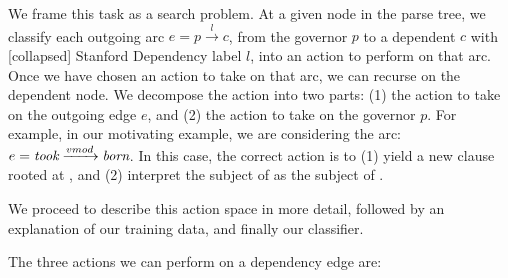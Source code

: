 
We frame this task as a search problem.
At a given node in the parse tree, we classify each outgoing arc
  $e = p \xrightarrow{l} c$, from the governor $p$ to a dependent $c$ 
  with [collapsed] Stanford Dependency label $l$,
  into an action to perform on that arc.
Once we have chosen an action to take on that arc, we can recurse on the
  dependent node.
We decompose the action into two parts: (1) the action to take on the outgoing
  edge $e$, and (2) the action to take on the
  governor $p$.
For example, in our motivating example, we are considering the arc:
  $e = \textit{took} \xrightarrow{vmod} \textit{born}$.
In this case, the correct action is to
  (1) yield a new clause rooted at ,
  and (2) interpret the subject of  as the subject
  of .



We proceed to describe this action space in more detail, followed by an
  explanation of our training data, and finally our classifier.

%
%
The three actions we can perform on a dependency edge are:

